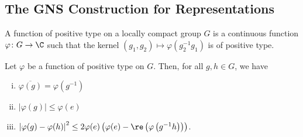 \documentclass[10pt]{mypackage}
\begin{document}
\subsection{The GNS Construction for Representations}%
\begin{definition}
  A function of positive type on a locally compact group $G$ is a continuous function $\varphi\colon G\to \C$ such that the kernel $\left( g_1,g_2 \right)\mapsto \varphi\left( g_2^{-1}g_1 \right)$ is of positive type.
\end{definition}
\begin{proposition}
  Let $\varphi$ be a function of positive type on $G$. Then, for all $g,h\in G$, we have
  \begin{enumerate}[(i)]
    \item $ \overline{\varphi(g)} = \varphi\left( g^{-1} \right) $
    \item $ \left\vert \varphi(g) \right\vert\leq \varphi(e) $
    \item $\left\vert \varphi(g)-\varphi(h) \right\vert^2 \leq 2\varphi(e)\left( \varphi(e)-\re\left( \varphi\left( g^{-1}h \right) \right) \right)$.
  \end{enumerate}
\end{proposition}
\end{document}
